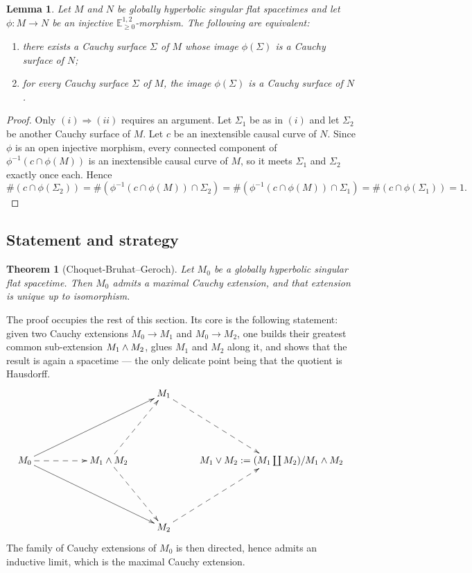\documentclass[a4paper,twoside]{article}
\newcommand{\mass}[1]{\mathbb{E}^{1,2}_{#1}}
\newtheorem{lem}{Lemma}[section]
\newtheorem{theo}{Theorem}
\begin{document}
\begin{lem}\label{lem:Cauchy_plongement_toutes}
Let $M$ and $N$ be globally hyperbolic singular flat spacetimes and let $\phi:M\rightarrow N$ be an
injective $\mass{\geq0}$-morphism. The following are equivalent:
\begin{enumerate}[label=(\roman*)]
\item there exists a Cauchy surface $\Sigma$ of $M$ whose image $\phi(\Sigma)$ is a Cauchy surface of $N$;
\item for every Cauchy surface $\Sigma$ of $M$, the image $\phi(\Sigma)$ is a Cauchy surface of $N$.
\end{enumerate}
\end{lem}
\begin{proof}
Only $(i)\Rightarrow(ii)$ requires an argument. Let $\Sigma_1$ be as in $(i)$ and let $\Sigma_2$ be
another Cauchy surface of $M$. Let $c$ be an inextensible causal curve of $N$. Since $\phi$ is an
open injective morphism, every connected component of $\phi^{-1}\left(c\cap \phi(M)\right)$ is an
inextensible causal curve of $M$, so it meets $\Sigma_1$ and $\Sigma_2$ exactly once each. Hence
$$\#\left(c\cap \phi(\Sigma_2)\right)=\#\left(\phi^{-1}(c\cap \phi(M))\cap \Sigma_2\right)
=\#\left(\phi^{-1}(c\cap \phi(M))\cap \Sigma_1\right)=\#\left(c\cap \phi(\Sigma_1)\right)=1 .$$
\end{proof}

\subsection{Statement and strategy}

\begin{theo}[Choquet-Bruhat--Geroch]\label{theo:CBG}
Let $M_0$ be a globally hyperbolic singular flat spacetime. Then $M_0$ admits a maximal Cauchy
extension, and that extension is unique up to isomorphism.
\end{theo}

The proof occupies the rest of this section. Its core is the following statement: given two Cauchy
extensions $M_0\rightarrow M_1$ and $M_0\rightarrow M_2$, one builds their greatest common
sub-extension $M_1 \wedge M_2$, glues $M_1$ and $M_2$ along it, and shows that the result is again a
spacetime --- the only delicate point being that the quotient is Hausdorff.
$$
	\xymatrix{
		&&& M_1\ar@{-->}[ddr] &\\ &&&&\\
	M_0\ar[ddrrr]\ar[uurrr]\ar@{-->}[rr]&&\pgcd\ar@{-->}[uur]\ar@{-->}[ddr]& &\ppcm:=(M_1\coprod M_2)/\pgcd\\ &&&&\\
	&&&M_2\ar@{-->}[uur]&
	}
$$
The family of Cauchy extensions of $M_0$ is then directed, hence admits an inductive limit, which is
the maximal Cauchy extension.
\end{document}
